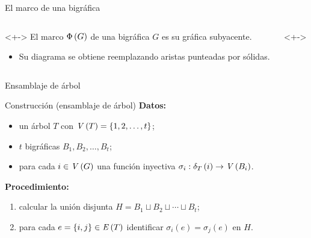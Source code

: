 \documentclass[spanish]{beamer}
\begin{document}
\begin{frame}{El marco de una bigráfica}
  \begin{columns}
    \begin{column}{0.5\textwidth}
      \begin{definition}<+->
        El \alert{marco} $\Marco{G}$ de una bigráfica $G$ es su gráfica 
        subyacente.
      \end{definition}
      \begin{itemize}[<+->]
        \item Su diagrama se obtiene reemplazando aristas punteadas por sólidas.
      \end{itemize}
    \end{column}
    \begin{column}{0.5\textwidth}
      \begin{example}<+->
        \centering
      \end{example}
    \end{column}
  \end{columns}
\end{frame}

\begin{frame}{Ensamblaje de árbol}
  \begin{block}{Construcción (ensamblaje de árbol)}
    \textbf{Datos:}
    \begin{itemize}[<+->]
      \item un árbol $T$ con $\VertexSet{T} = \Set{1, 2, \ldots, t}$;
      \item $t$ bigráficas $B_1, B_2, \ldots, B_t$;
      \item para cada $i \in \VertexSet{G}$ una función inyectiva $\sigma_i : 
      \frontier[T]{i} \to \VertexSet{B_i}$.
    \end{itemize}
    \textbf{Procedimiento:}
    \begin{enumerate}[<+->]
      \item calcular la unión disjunta  $H = B_1 \sqcup B_2 \sqcup \cdots 
      \sqcup B_t$;
      \item para cada $e = \Set{i, j} \in \EdgeSet{T}$ identificar 
      $\sigma_i\left(e\right) = \sigma_j\left(e\right)$ en $H$.
    \end{enumerate}
  \end{block}
\end{frame}
\end{document}
